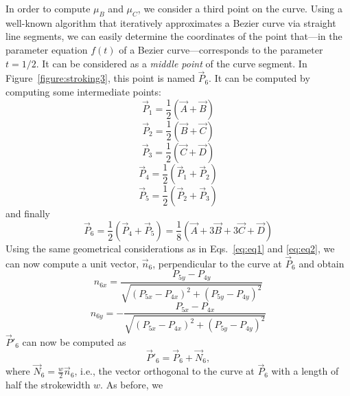 In order to compute $\mu_B$ and $\mu_C$, we consider a third point on the
curve. Using a well-known algorithm that iteratively approximates a Bezier
curve via straight line segments, we can easily determine the coordinates of
the point that---in the parameter equation $f(t)$ of a Bezier
curve---corresponds to the parameter $t=1/2$. It can be considered as a {\em
  middle point} of the curve segment. In Figure~\ref{figure:stroking3}, this
point is named $\vec{P}_6$. It can be computed by computing some intermediate
points: 
\begin{equation}
  \label{eq:eq5}
  \vec{P}_1 = \frac{1}{2} ( \vec{A} + \vec{B} )
\end{equation}
\begin{equation}
  \label{eq:eq6}
  \vec{P}_2 = \frac{1}{2} ( \vec{B} + \vec{C} )
\end{equation}
\begin{equation}
  \label{eq:eq7}
  \vec{P}_3 = \frac{1}{2} ( \vec{C} + \vec{D} )
\end{equation}
\begin{equation}
  \label{eq:eq8}
  \vec{P}_4 = \frac{1}{2} ( \vec{P}_1 + \vec{P}_2 )
\end{equation}
\begin{equation}
  \label{eq:eq9}
  \vec{P}_5 = \frac{1}{2} ( \vec{P}_2 + \vec{P}_3 )
\end{equation}
and finally
\begin{equation}
  \label{eq:eq10}
  \vec{P}_6 = \frac{1}{2} ( \vec{P}_4 + \vec{P}_5 ) 
  = \frac{1}{8} ( \vec{A} + 3 \vec{B} + 3 \vec{C} + \vec{D} ) 
\end{equation}
Using the same geometrical considerations as in Eqs.~\ref{eq:eq1} and
\ref{eq:eq2}, we can now compute a unit vector, $\vec{n}_6$, perpendicular to
the curve at $\vec{P}_6$ and obtain
\begin{equation}
  \label{eq:eq11}
  n_{6x} = \frac{ P_{5y} - P_{4y} }{\sqrt{(P_{5x}-P_{4x})^2 + (P_{5y}-P_{4y})^2}}
\end{equation}
\begin{equation}
  \label{eq:eq12}
  n_{6y} = - \frac{ P_{5x} - P_{4x} }{\sqrt{(P_{5x}-P_{4x})^2 + (P_{5y}-P_{4y})^2}}
\end{equation}
$\vec{P}'_6$ can now be computed as 
\begin{equation}
  \label{eq:eq13}
  \vec{P}'_6 = \vec{P}_6 + \vec{N}_6,
\end{equation}
where $\vec{N}_6 = \frac{w}{2} \vec{n}_6$, i.e., the vector orthogonal to the
curve at $\vec{P}_6$ with a length of half the strokewidth $w$. As before, we
